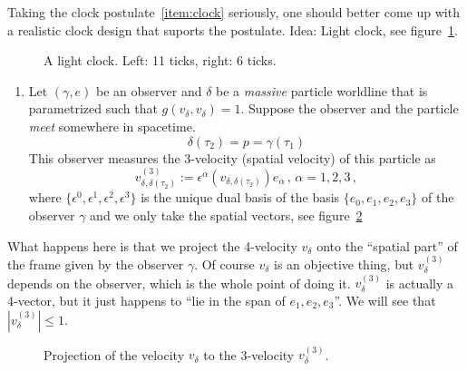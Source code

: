 \documentclass[11pt, a4paper, twocolumn]{article} %
\begin{document}
    Taking the clock postulate~\ref{item:clock} seriously,
    one should better come up with a realistic clock design that suports the postulate.
    Idea: Light clock, see figure~\ref{fig:lightClock}.
    \begin{figure}[tbh]
        \centering{}
        
        \caption{A light clock. Left: 11 ticks, right: 6 ticks.}
        \label{fig:lightClock}
    \end{figure}
    \begin{enumerate}[resume, label=(\subscript{P}{{\arabic*}})]
        \item Let $(\gamma, e)$ be an observer and $\delta$ be a \textit{massive} particle worldline
            that is parametrized such that $g(v_\delta, v_\delta)=1$.
            Suppose the observer and the particle \textit{meet} somewhere in spacetime.
            \begin{equation}
                \delta(\tau_2) = p = \gamma(\tau_1)
            \end{equation}
            This observer measures the 3-velocity (spatial velocity) of this particle as 
            \begin{equation}
                v^{(3)}_{\delta, \delta(\tau_2)} := \epsilon^\alpha\left(v_{\delta, \delta(\tau_2)}\right)e_\alpha\,,
                \, \alpha = 1,2,3\,,
            \end{equation}
            where $\{\epsilon^0, \epsilon^1, \epsilon^2, \epsilon^3\}$ is the unique dual basis
            of the basis $\{e_0, e_1, e_2, e_3\}$ of the observer $\gamma$ and we only take the spatial vectors,
            see figure~\ref{fig:3velocity}
            \label{item:3velocity}
    \end{enumerate}
    \begin{note}
        What happens here is that we project the 4-velocity $v_\delta$ onto the ``spatial part'' of the
        frame given by the observer $\gamma$.
        Of course $v_\delta$ is an objective thing, but $v_\delta^{(3)}$ depends on the observer,
        which is the whole point of doing it.
        $v_\delta^{(3)}$ is actually a 4-vector, but it just happens to ``lie in the span of $e_1, e_2, e_3$''.
        We will see that $|v_\delta^{(3)}|\leq 1$.
    \end{note}
    \begin{figure}[tbh]
        \centering\def\svgwidth{\columnwidth}
        
        \caption{Projection of the velocity $v_\delta$ to the 3-velocity $v_\delta^{(3)}$.}
        \label{fig:3velocity}
    \end{figure}
\end{document}
